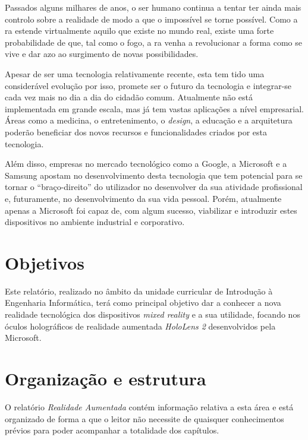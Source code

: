 \documentclass{report}
\begin{document}
Passados alguns milhares de anos, o ser humano continua a tentar ter ainda mais controlo sobre a realidade de modo a que o impossível se torne possível. Como a \ac{ra} estende virtualmente aquilo que existe no mundo real, existe uma forte probabilidade de que, tal como o fogo, a \ac{ra} venha a revolucionar a forma como se vive e dar azo ao surgimento de novas possibilidades.

Apesar de ser uma tecnologia relativamente recente, esta tem tido uma considerável evolução por isso, promete ser o futuro da tecnologia e integrar-se cada vez mais no dia a dia do cidadão comum. Atualmente não está implementada em grande escala, mas já tem vastas aplicações a nível empresarial. Áreas como a medicina, o entretenimento, o \textit{design}, a educação e a arquitetura poderão beneficiar dos novos recursos e funcionalidades criados por esta tecnologia.

Além disso, empresas no mercado tecnológico como a Google, a Microsoft e a Samsung apostam no desenvolvimento desta tecnologia que tem potencial para se tornar o “braço-direito” do utilizador no desenvolver da sua atividade profissional e, futuramente, no desenvolvimento da sua vida pessoal. Porém, atualmente apenas a Microsoft foi capaz de, com algum sucesso, viabilizar e introduzir estes dispositivos no ambiente industrial e corporativo.

\section{Objetivos}
Este relatório, realizado no âmbito da unidade curricular de Introdução à Engenharia Informática, terá como principal objetivo dar a conhecer a nova realidade tecnológica dos dispositivos \textit{mixed reality} e a sua utilidade, focando nos óculos holográficos de realidade aumentada \textit{HoloLens 2} desenvolvidos pela Microsoft.

\section{Organização e estrutura}
O relatório \textit{Realidade Aumentada} contém informação relativa a esta área e está organizado de forma a que o leitor não necessite de quaisquer conhecimentos prévios para poder acompanhar a totalidade dos capítulos.
\end{document}
